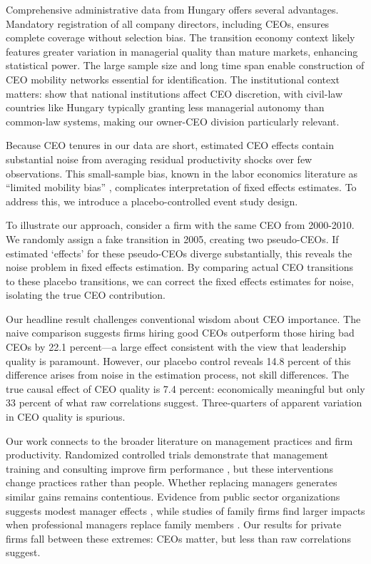 \documentclass[11pt,a4paper]{article}
\begin{document}
Comprehensive administrative data from Hungary offers several advantages. Mandatory registration of all company directors, including CEOs, ensures complete coverage without selection bias. The transition economy context likely features greater variation in managerial quality than mature markets, enhancing statistical power. The large sample size and long time span enable construction of CEO mobility networks essential for identification. The institutional context matters: \citet{crossland2011differences} show that national institutions affect CEO discretion, with civil-law countries like Hungary typically granting less managerial autonomy than common-law systems, making our owner-CEO division particularly relevant.

Because CEO tenures in our data are short, estimated CEO effects contain substantial noise from averaging residual productivity shocks over few observations. This small-sample bias, known in the labor economics literature as ``limited mobility bias'' \citep{andrews2008high}, complicates interpretation of fixed effects estimates. To address this, we introduce a placebo-controlled event study design.

To illustrate our approach, consider a firm with the same CEO from 2000-2010. We randomly assign a fake transition in 2005, creating two pseudo-CEOs. If estimated `effects' for these pseudo-CEOs diverge substantially, this reveals the noise problem in fixed effects estimation. By comparing actual CEO transitions to these placebo transitions, we can correct the fixed effects estimates for noise, isolating the true CEO contribution.

Our headline result challenges conventional wisdom about CEO importance. The naive comparison suggests firms hiring good CEOs outperform those hiring bad CEOs by 22.1 percent—a large effect consistent with the view that leadership quality is paramount. However, our placebo control reveals 14.8 percent of this difference arises from noise in the estimation process, not skill differences. The true causal effect of CEO quality is 7.4 percent: economically meaningful but only 33 percent of what raw correlations suggest. Three-quarters of apparent variation in CEO quality is spurious.

Our work connects to the broader literature on management practices and firm productivity. Randomized controlled trials demonstrate that management training and consulting improve firm performance \citep{bloom2013does}, but these interventions change practices rather than people. Whether replacing managers generates similar gains remains contentious. Evidence from public sector organizations suggests modest manager effects \citep{fenizia2022managers, janke2024role}, while studies of family firms find larger impacts when professional managers replace family members \citep{bennedsen2007inside}. Our results for private firms fall between these extremes: CEOs matter, but less than raw correlations suggest.
\end{document}
